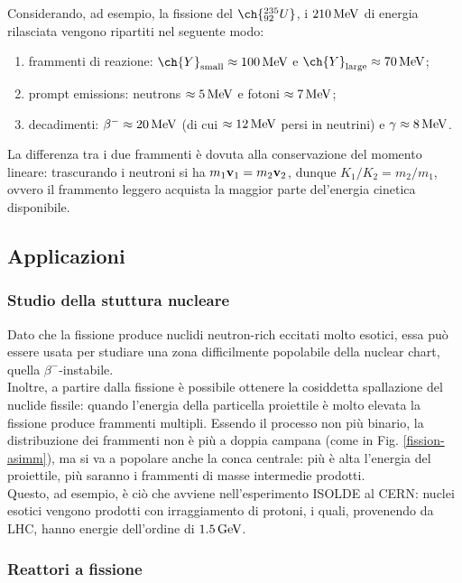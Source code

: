 Considerando, ad esempio, la fissione del $ \ch{^{235}_{92} U} $, i $ 210\,\mathrm{MeV} $ di energia rilasciata vengono ripartiti nel seguente modo:
\begin{enumerate}
	\item frammenti di reazione: $ \ch{Y}_{\text{small}} \approx 100\mev $ e $ \ch{Y}_{\text{large}} \approx 70\mev $;
	\item prompt emissions: neutrons $ \approx 5\,\mathrm{MeV} $ e fotoni $ \approx 7\,\mathrm{MeV} $;
	\item decadimenti: $ \beta^- \approx 20\,\mathrm{MeV} $ (di cui $ \approx 12\,\mathrm{MeV} $ persi in neutrini) e $ \gamma \approx 8\,\mathrm{MeV} $.
\end{enumerate}
La differenza tra i due frammenti è dovuta alla conservazione del momento lineare: trascurando i neutroni si ha $ m_1 \mathbf{v}_1 = m_2 \mathbf{v}_2 $, dunque $ K_1 / K_2 = m_2 / m_1 $, ovvero il frammento leggero acquista la maggior parte del'energia cinetica disponibile.

\subsection{Applicazioni}

\subsubsection{Studio della stuttura nucleare}

Dato che la fissione produce nuclidi neutron-rich eccitati molto esotici, essa può essere usata per studiare una zona difficilmente popolabile della nuclear chart, quella $ \beta^- $-instabile.\\
Inoltre, a partire dalla fissione è possibile ottenere la cosiddetta spallazione del nuclide fissile: quando l'energia della particella proiettile è molto elevata la fissione produce frammenti multipli. Essendo il processo non più binario, la distribuzione dei frammenti non è più a doppia campana (come in Fig. \ref{fission-asimm}), ma si va a popolare anche la conca centrale: più è alta l'energia del proiettile, più saranno i frammenti di masse intermedie prodotti.\\
Questo, ad esempio, è ciò che avviene nell'esperimento ISOLDE al CERN: nuclei esotici vengono prodotti con irraggiamento di protoni, i quali, provenendo da LHC, hanno energie dell'ordine di $ 1.5\,\mathrm{GeV} $.

\subsubsection{Reattori a fissione}

